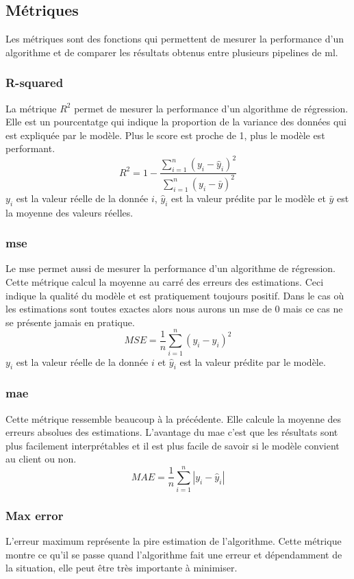 \subsection{Métriques}
Les métriques sont des fonctions qui permettent de mesurer la performance d'un algorithme et de comparer les résultats obtenus entre plusieurs pipelines de \acrlong{ml}.

\subsubsection{R-squared}
La métrique $R^2$ permet de mesurer la performance d'un algorithme de régression.
Elle est un pourcentatge qui indique la proportion de la variance des données qui est expliquée par le modèle.
Plus le score est proche de 1, plus le modèle est performant.
\begin{equation*}
    R^2 = 1 - \frac{\sum_{i=1}^n (y_i - \hat{y}_i)^2}{\sum_{i=1}^n (y_i - \bar{y})^2}
\end{equation*}
$y_i$ est la valeur réelle de la donnée $i$, $\hat{y}_i$ est la valeur prédite par le modèle et $\bar{y}$ est la moyenne des valeurs réelles.

\subsubsection{\acrlong{mse}}
Le \acrfull{mse} permet aussi de mesurer la performance d'un algorithme de régression.
Cette métrique calcul la moyenne au carré des erreurs des estimations.
Ceci indique la qualité du modèle et est pratiquement toujours positif.
Dans le cas où les estimations sont toutes exactes alors nous aurons un \acrfull{mse} de 0 mais ce cas ne se présente jamais en pratique.
\begin{equation*}
    MSE = \frac{1}{n} \sum_{i=1}^n (y_i - \hat{y}_i)^2
\end{equation*}
$y_i$ est la valeur réelle de la donnée $i$ et $\hat{y}_i$ est la valeur prédite par le modèle.

\subsubsection{\acrlong{mae}}
Cette métrique ressemble beaucoup à la précédente.
Elle calcule la moyenne des erreurs absolues des estimations.
L'avantage du \acrfull{mae} c'est que les résultats sont plus facilement interprétables et il est plus facile de savoir si le modèle convient au client ou non.
\begin{equation*}
    MAE = \frac{1}{n} \sum_{i=1}^n |y_i - \hat{y}_i|
\end{equation*}

\subsubsection{Max error}
L'erreur maximum représente la pire estimation de l'algorithme.
Cette métrique montre ce qu'il se passe quand l'algorithme fait une erreur et dépendamment de la situation, elle peut être très importante à minimiser.

